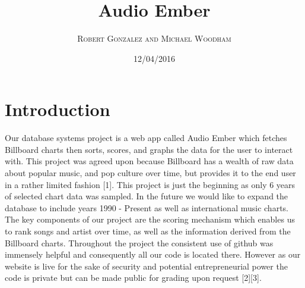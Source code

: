 \documentclass{article}
\begin{document}
\setlength\parindent{24pt}
\title{\textbf{Audio Ember}}
\author{\textsc{Robert Gonzalez and Michael Woodham}}
\date{12/04/2016}
\maketitle


\section*{Introduction}
Our database systems project is a web app called Audio Ember which fetches Billboard charts then sorts, scores, and graphs the data for the user to interact with. This project was agreed upon because Billboard has a wealth of raw data about popular music, and pop culture over time, but provides it to the end user in a rather limited fashion [1]. This project is just the beginning as only 6 years of selected chart data was sampled. In the future we would like to expand the database to include years 1990 - Present as well as international music charts. The key components of our project are the scoring mechanism which enables us to rank songs and artist over time, as well as the information derived from the Billboard charts. Throughout the project the consistent use of github was immensely helpful and consequently all our code is located there. However as our website is live for the sake of security and potential entrepreneurial power the code is private but can be made public for grading upon request [2][3].
\end{document}
